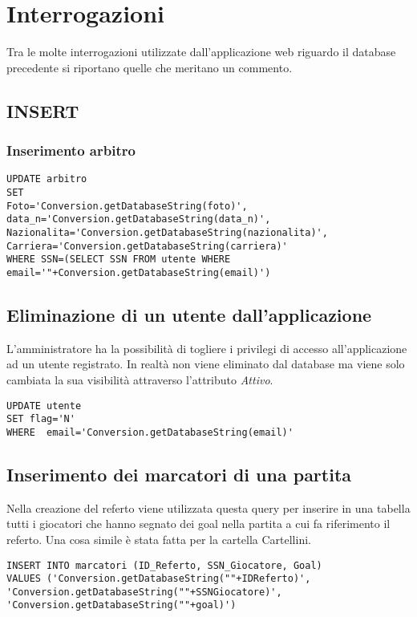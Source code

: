 \section{Interrogazioni}
Tra le molte interrogazioni utilizzate dall'applicazione web riguardo il database precedente si riportano quelle che meritano un commento.

\subsection{INSERT}

\subsubsection*{Inserimento arbitro}

\begin{lstlisting}
UPDATE arbitro
SET 
Foto='Conversion.getDatabaseString(foto)', data_n='Conversion.getDatabaseString(data_n)',
Nazionalita='Conversion.getDatabaseString(nazionalita)', Carriera='Conversion.getDatabaseString(carriera)'
WHERE SSN=(SELECT SSN FROM utente WHERE email='"+Conversion.getDatabaseString(email)')
\end{lstlisting}

\subsection*{Eliminazione di un utente dall'applicazione}
L'amministratore ha la possibilità di togliere i privilegi di accesso all'applicazione ad un utente registrato. In realtà non viene eliminato dal database ma viene solo cambiata la sua visibilità attraverso l'attributo \emph{Attivo}.

\begin{lstlisting}
UPDATE utente
SET flag='N' 
WHERE  email='Conversion.getDatabaseString(email)'
\end{lstlisting}


\subsection*{Inserimento dei marcatori di una partita}
Nella creazione del referto viene utilizzata questa query per inserire in una tabella tutti i giocatori che hanno segnato dei goal nella partita a cui fa riferimento il referto. Una cosa simile è stata fatta per la cartella Cartellini.

\begin{lstlisting}
INSERT INTO marcatori (ID_Referto, SSN_Giocatore, Goal) 
VALUES ('Conversion.getDatabaseString(""+IDReferto)', 'Conversion.getDatabaseString(""+SSNGiocatore)', 'Conversion.getDatabaseString(""+goal)')
\end{lstlisting}

